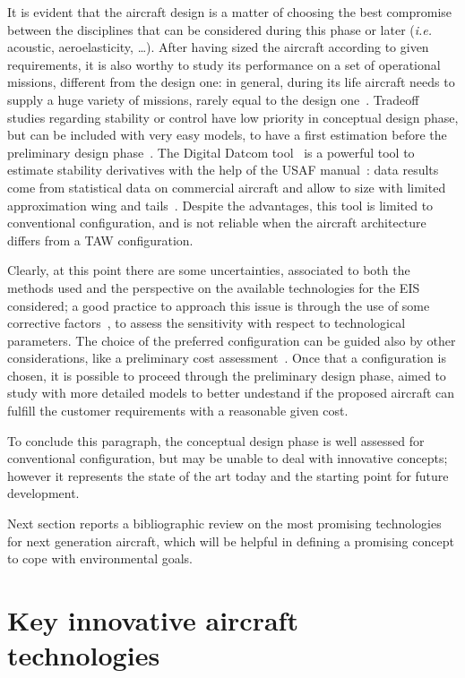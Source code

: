 It is evident that the aircraft design is a matter of choosing the best compromise between the disciplines that can be considered during this phase or later (\textit{i.e.} acoustic, aeroelasticity, \dots). 
After having sized the aircraft according to given requirements, it is also worthy to study its performance on a set of operational missions, different from the design one: in general, during its life aircraft needs to supply a huge variety of missions, rarely equal to the design one~\cite{bib:roskam_partVIII}.
Tradeoff studies regarding stability or control have low priority in conceptual design phase, but can be included with very easy models, to have a first estimation before the preliminary design phase~\cite{bib:roskam_partVII}.
The Digital Datcom tool~\cite{bib:datcom} is a powerful tool to estimate stability derivatives with the help of the USAF manual~\cite{bib:datcom_ref}: data results come from statistical data on commercial aircraft and allow to size with limited approximation wing and tails~\cite{bib:sforza}. 
Despite the advantages, this tool is limited to conventional configuration, and is not reliable when the aircraft architecture differs from a TAW configuration. 

Clearly, at this point there are some uncertainties, associated to both the methods used and the perspective on the available technologies for the EIS considered; a good practice to approach this issue is through the use of some corrective factors~\cite{bib:kirby}, to assess the sensitivity with respect to technological parameters. 
The choice of the preferred configuration can be guided also by other considerations, like a preliminary cost assessment~\cite{bib:roskam_partVIII}. Once that a configuration is chosen, it is possible to proceed through the preliminary design phase, aimed to study with more detailed models to better undestand if the proposed aircraft can fulfill the customer requirements with a reasonable given cost. 

To conclude this paragraph, the conceptual design phase is well assessed for conventional configuration, but may be unable to deal with innovative concepts; however it represents the state of the art today and the starting point for future development. 

Next section reports a bibliographic review on the most promising technologies for next generation aircraft, which will be helpful in defining a promising concept to cope with environmental goals. 

\section{Key innovative aircraft technologies}
\label{sec:chap1_key_innovative_techno}

